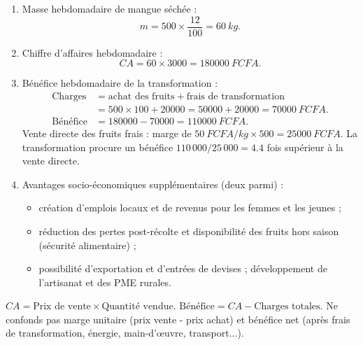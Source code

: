 \documentclass[11pt]{article}
\begin{document}
\begin{corrige}
\begin{enumerate}
\item Masse hebdomadaire de mangue séchée :
\[ m = 500 \times \frac{12}{100} = \SI{60}{kg}. \]
\item Chiffre d'affaires hebdomadaire :
\[ CA = 60 \times 3000 = \SI{180000}{FCFA}. \]
\item Bénéfice hebdomadaire de la transformation :
\begin{align*}
\text{Charges} &= \text{achat des fruits} + \text{frais de transformation} \\
&= 500 \times 100 + \num{20000} = \num{50000} + \num{20000} = \SI{70000}{FCFA}. \\
\text{Bénéfice} &= \num{180000} - \num{70000} = \SI{110000}{FCFA}.
\end{align*}
Vente directe des fruits frais : marge de $\SI{50}{FCFA/kg} \times 500 = \SI{25000}{FCFA}$.
La transformation procure un bénéfice $110\,000 / 25\,000 = \num{4,4}$ fois supérieur à la vente directe.
\item Avantages socio-économiques supplémentaires (deux parmi) :
\begin{itemize}
\item création d'emplois locaux et de revenus pour les femmes et les jeunes ;
\item réduction des pertes post-récolte et disponibilité des fruits hors saison (sécurité alimentaire) ;
\item possibilité d'exportation et d'entrées de devises ; développement de l'artisanat et des PME rurales.
\end{itemize}
\end{enumerate}
\end{corrige}

\begin{attention}
$CA = \text{Prix de vente} \times \text{Quantité vendue}$. $\text{Bénéfice} = CA - \text{Charges totales}$. Ne confonds pas marge unitaire (prix vente - prix achat) et bénéfice net (après frais de transformation, énergie, main-d'œuvre, transport...).
\end{attention}
\end{document}
